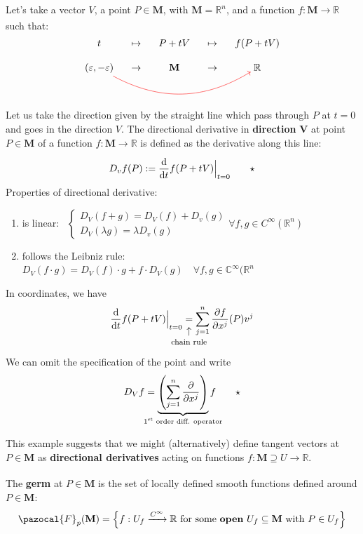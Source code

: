 \documentclass[../main.tex]{subfiles}
\begin{document}
\begin{example}
Let's take a vector $V$, a point $P \in\mathbf{M}$, with $\mathbf{M}=\mathbb{R}^n$, and a function $f:\mathbf{M}\xrightarrow[]{}\mathbb{R}$ such that:
\[
\begin{tikzcd}[cramped, sep=small] 
t &\mapsto & P+tV &\mapsto &f(P+tV)\\
\left(\varepsilon,-\varepsilon\right)\arrow[red, bend right]{rrrr} &\to &\mathbf{M} &\to& \mathbb{R}
\end{tikzcd}
\]
Let us take the direction given by the straight line which pass through $P$ at $t=0$ and goes in the direction $V$. The directional derivative in \textbf{direction} $\mathbf{V}$ at point $P\in\mathbf{M}$ of a function $f:\mathbf{M}\xrightarrow[]{}\mathbb{R}$ is defined as the derivative along this line:
\[
D_v f(P):=\dv{t}f(P+tV)\Bigr|_{\substack{t=0}} \qquad \star
\]
Properties of directional derivative:
\begin{enumerate}
    \item is linear: \ $\begin{cases}
    D_V(f+g)=D_V(f)+D_v(g) \\
    D_V(\lambda g)=\lambda D_v(g)
    \end{cases}
    \forall f,g \in C^{\infty}(\mathbb{R}^n)$
    \item follows the Leibniz rule:\\
    $D_V(f\cdot g)=D_V(f)\cdot g+f\cdot D_V(g) \quad \forall f,g \in\mathbb{C}^{\infty}(\mathbb{R}^n$
\end{enumerate}
In coordinates, we have 
\[
\dv{t}f(P+tV)\Bigr|_{\substack{t=0}}\underset{\mathclap{\tikz \node {$\uparrow$} node [below=1ex] {\footnotesize chain rule};}}{=}\sum_{j=1}^n \frac{\partial f}{\partial x^j}(P) v^j
\]
We can omit the specification of the point and write
\[
D_V f=\underbrace{\left(\sum_{j=1}^n \frac{\partial}{\partial x^j}\right)}_{\mathclap{\text{$1^{\textrm{st}}$ order diff. operator}}}f \qquad \star
\]
\end{example}
This example suggests that we might (alternatively) define tangent vectors at $P \in\mathbf{M}$ as \textbf{directional derivatives} acting on functions $f:\mathbf{M}\supseteq U\xrightarrow[]{}\mathbb{R}$.
\begin{definition}
The \textbf{germ} at $P \in\mathbf{M}$ is the set of locally defined smooth functions defined around $P \in\mathbf{M}$:
\[
\pazocal{F}_p(\mathbf{M})=\left\{f:U_f\xrightarrow{C^\infty}\mathbb{R}\text{ for some \textbf{open} } U_f\subseteq\mathbf{M}\text{ with } P \in U_f\right\}
\]
\end{definition}
\end{document}
